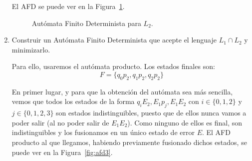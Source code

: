 \documentclass[12pt]{article}
\begin{document}
\begin{ejercicio}
\begin{enumerate}
            El AFD se puede ver en la Figura~\ref{fig:afd2}.
            \begin{figure}
                \centering
                \caption{Autómata Finito Determinista para $L_2$.}
                \label{fig:afd2}
            \end{figure}
        \item Construir un Autómata Finito Determinista que acepte el lenguaje $L_1\cap L_2$ y minimizarlo.
        
        Para ello, usaremos el autómata producto. Los estados finales son:
        \begin{equation*}
            F = \{q_0p_2, q_1p_2, q_2p_2\}
        \end{equation*}

        En primer lugar, y para que la obtención del autómata sea más sencilla, vemos que todos los estados de la forma $q_iE_2, E_1p_j, E_1E_2$ con $i\in\{0,1,2\}$ y $j\in\{0,1,2,3\}$ son estados indistinguibles, puesto que de ellos nunca vamos a poder salir (al no poder salir de $E_1E_2$). Como ninguno de ellos es final, son indistinguibles y los fusionamos en un único estado de error $E$.
        El AFD producto al que llegamos, habiendo previamente fusionado dichos estados, se puede ver en la Figura~\ref{fig:afd3}.
        \begin{figure}
            \centering
\end{figure}
\end{enumerate}
\end{ejercicio}
\end{document}
